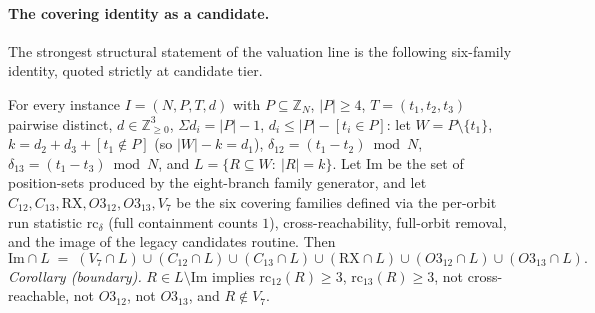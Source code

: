 \paragraph{The covering identity as a candidate.}
The strongest structural statement of the valuation line is the following
six-family identity, quoted strictly at candidate tier.

\begin{proposition}\label{prop:clacover}
For every instance $I=(N,P,T,d)$ with $P\subseteq\mathbb{Z}_N$,
$|P|\ge4$, $T=(t_1,t_2,t_3)$ pairwise distinct,
$d\in\mathbb{Z}_{\ge0}^3$, $\Sigma d_i=|P|-1$,
$d_i\le|P|-[t_i\in P]$: let $W=P\setminus\{t_1\}$,
$k=d_2+d_3+[t_1\notin P]$ (so $|W|-k=d_1$),
$\delta_{12}=(t_1-t_2)\bmod N$, $\delta_{13}=(t_1-t_3)\bmod N$, and
$L=\{R\subseteq W:\ |R|=k\}$. Let $\mathrm{Im}$ be the set of position-sets
produced by the eight-branch family generator, and let
$C_{12},C_{13},\mathrm{RX},O3_{12},O3_{13},V_7$ be the six covering
families defined via the per-orbit run statistic $\mathrm{rc}_\delta$
(full containment counts $1$), cross-reachability, full-orbit removal, and
the image of the legacy candidates routine. Then
\[
\mathrm{Im}\cap L \;=\; (V_7\cap L)\cup(C_{12}\cap L)\cup(C_{13}\cap L)
\cup(\mathrm{RX}\cap L)\cup(O3_{12}\cap L)\cup(O3_{13}\cap L).
\]
\emph{Corollary (boundary).} $R\in L\setminus\mathrm{Im}$ implies
$\mathrm{rc}_{12}(R)\ge3$, $\mathrm{rc}_{13}(R)\ge3$, not
cross-reachable, not $O3_{12}$, not $O3_{13}$, and $R\notin V_7$.
\end{proposition}

